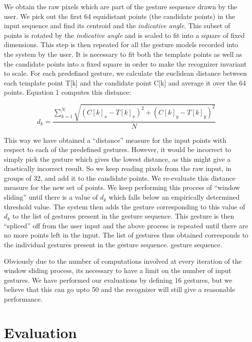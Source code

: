 \documentclass[twoside]{article}
\begin{document}
\begin{multicols}{2}
We obtain the raw pixels which are part of the gesture sequence drawn by the
user. We pick out the first 64 equidistant points (the candidate points) in the
input sequence and find its centroid and the \textit{indicative angle}. This
subset of points is rotated by the \textit{indicative angle} and is scaled to
fit into a square of fixed dimensions. This step is then repeated for all the
gesture models recorded into the system by the user. It is necessary to fit both
the template points as well as the candidate points into a fixed square in order
to make the recognizer invariant to scale. For each predefined gesture, we
calculate the euclidean distance between each template point T[k] and the
candidate point C[k] and average it over the 64 points. Equation 1 computes this
distance:

\[
 d_k = \frac{\displaystyle\sum\limits_{k=1}^N \sqrt{(C[k]_x-T[k]_x)^2 + (C[k]_y-T[k]_y)^2}}{N}
\]

This way we have obtained a ``distance'' measure for the input points with
respect to each of the predefined gestures. However, it would be incorrect to
simply pick the gesture which gives the lowest distance, as this might give a
drastically incorrect result. So we keep reading pixels from the raw input, in
groups of 32, and add it to the candidate points. We re-evaluate this distance
measure for the new set of points. We keep performing this process of ``window
sliding'' until there is a value of $d_k$ which falls below an empirically
determined threshold value. The system then adds the gesture corresponding to
this value of $d_k$ to the list of gestures present in the gesture sequence.
This gesture is then ``spliced'' off from the user input and the above process
is repeated until there are no more points left in the input. The list of
gestures thus obtained corresponds to the individual gestures present in the
gesture sequence. %
gesture sequence.

Obviously due to the number of computations involved at every iteration of the
window sliding process, its necessary to have a limit on the number of input
gestures. We have performed our evaluations by defining 16 gestures, but we
believe that this can go upto 50 and the recognizer will still give a reasonable
performance. %

\section{Evaluation}


\end{multicols}
\end{document}
